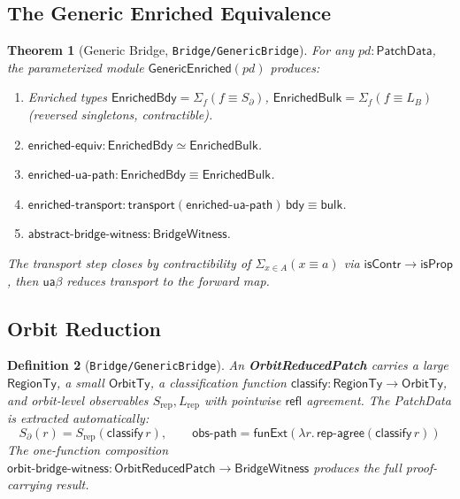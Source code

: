 \documentclass[11pt,a4paper]{article}
\newtheorem{theorem}{Theorem}[section]
\newtheorem{definition}[theorem]{Definition}
\newcommand{\refl}{\mathsf{refl}}
\newcommand{\ua}{\mathsf{ua}}
\newcommand{\transport}{\mathsf{transport}}
\newcommand{\funExt}{\mathsf{funExt}}
\newcommand{\isContr}{\mathsf{isContr}}
\newcommand{\isProp}{\mathsf{isProp}}
\newcommand{\module}[1]{\texttt{#1}}
\begin{document}
\subsection{The Generic Enriched Equivalence}

\begin{theorem}[Generic Bridge, \module{Bridge/GenericBridge}]
\label{thm:generic-bridge}
For any $\mathit{pd} : \mathsf{PatchData}$, the parameterized
module $\mathsf{GenericEnriched}(\mathit{pd})$ produces:
\begin{enumerate}[nosep]
\item Enriched types
  $\mathsf{EnrichedBdy} = \Sigma_{f} (f \equiv S_\partial)$,
  $\mathsf{EnrichedBulk} = \Sigma_{f} (f \equiv L_B)$
  (reversed singletons, contractible).
\item $\mathsf{enriched\text{-}equiv} :
  \mathsf{EnrichedBdy} \simeq \mathsf{EnrichedBulk}$.
\item $\mathsf{enriched\text{-}ua\text{-}path} :
  \mathsf{EnrichedBdy} \equiv \mathsf{EnrichedBulk}$.
\item $\mathsf{enriched\text{-}transport} :
  \transport(\mathsf{enriched\text{-}ua\text{-}path})\,
  \mathsf{bdy} \equiv \mathsf{bulk}$.
\item $\mathsf{abstract\text{-}bridge\text{-}witness} :
  \mathsf{BridgeWitness}$.
\end{enumerate}
The transport step closes by contractibility of
$\Sigma_{x \in A}(x \equiv a)$ via $\isContr \to \isProp$,
then $\ua\beta$ reduces transport to the forward map.
\end{theorem}

\subsection{Orbit Reduction}

\begin{definition}[\module{Bridge/GenericBridge}]
An \textbf{OrbitReducedPatch} carries a large $\mathsf{RegionTy}$,
a small $\mathsf{OrbitTy}$, a classification function
$\mathsf{classify} : \mathsf{RegionTy} \to \mathsf{OrbitTy}$, and
orbit-level observables $S_{\mathrm{rep}}, L_{\mathrm{rep}}$ with
pointwise $\refl$ agreement.  The PatchData is extracted
automatically:
\[
  S_\partial(r) = S_{\mathrm{rep}}(\mathsf{classify}\, r), \qquad
  \mathsf{obs\text{-}path} =
  \funExt(\lambda r.\, \mathsf{rep\text{-}agree}(\mathsf{classify}\, r))
\]
The one-function composition
$\mathsf{orbit\text{-}bridge\text{-}witness} :
\mathsf{OrbitReducedPatch} \to \mathsf{BridgeWitness}$
produces the full proof-carrying result.
\end{definition}
\end{document}
